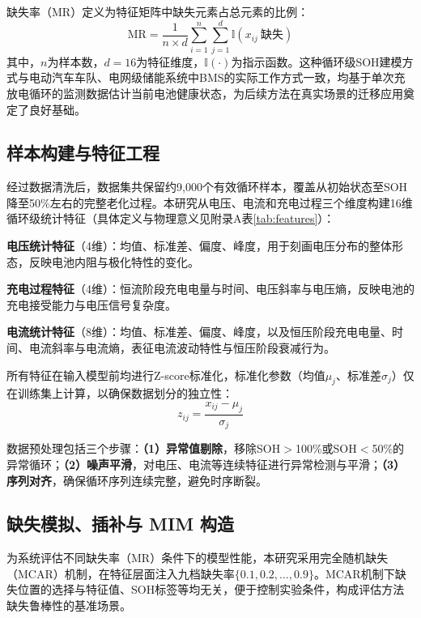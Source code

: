 \documentclass[10pt,a4paper]{ctexart}
\begin{document}
缺失率（MR）定义为特征矩阵中缺失元素占总元素的比例：
\begin{equation}
    \text{MR} = \frac{1}{n \times d} \sum_{i=1}^{n}\sum_{j=1}^{d} \mathbb{I}(x_{ij}\ \text{缺失})
    \label{eq:mr}
\end{equation}
其中，$n$为样本数，$d=16$为特征维度，$\mathbb{I}(\cdot)$为指示函数。这种循环级SOH建模方式与电动汽车车队、电网级储能系统中BMS的实际工作方式一致，均基于单次充放电循环的监测数据估计当前电池健康状态，为后续方法在真实场景的迁移应用奠定了良好基础。

\subsection{样本构建与特征工程}

经过数据清洗后，数据集共保留约9,000个有效循环样本，覆盖从初始状态至SOH降至50\%左右的完整老化过程。本研究从电压、电流和充电过程三个维度构建16维循环级统计特征（具体定义与物理意义见附录A表\ref{tab:features}）：

\textbf{电压统计特征}（4维）：均值、标准差、偏度、峰度，用于刻画电压分布的整体形态，反映电池内阻与极化特性的变化。

\textbf{充电过程特征}（4维）：恒流阶段充电电量与时间、电压斜率与电压熵，反映电池的充电接受能力与电压信号复杂度。

\textbf{电流统计特征}（8维）：均值、标准差、偏度、峰度，以及恒压阶段充电电量、时间、电流斜率与电流熵，表征电流波动特性与恒压阶段衰减行为。

所有特征在输入模型前均进行Z-score标准化，标准化参数（均值$\mu_j$、标准差$\sigma_j$）仅在训练集上计算，以确保数据划分的独立性：
\begin{equation}
    z_{ij} = \frac{x_{ij} - \mu_j}{\sigma_j}
\end{equation}

数据预处理包括三个步骤：\textbf{（1）异常值剔除}，移除SOH$>$100\%或SOH$<$50\%的异常循环；\textbf{（2）噪声平滑}，对电压、电流等连续特征进行异常检测与平滑；\textbf{（3）序列对齐}，确保循环序列连续完整，避免时序断裂。

\subsection{缺失模拟、插补与 MIM 构造}

为系统评估不同缺失率（MR）条件下的模型性能，本研究采用完全随机缺失（MCAR）机制，在特征层面注入九档缺失率$\{0.1, 0.2, \ldots, 0.9\}$。MCAR机制下缺失位置的选择与特征值、SOH标签等均无关，便于控制实验条件，构成评估方法缺失鲁棒性的基准场景。
\end{document}
